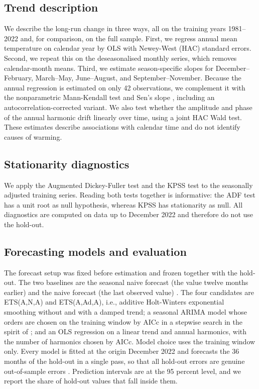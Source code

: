 \subsection{Trend description}

We describe the long-run change in three ways, all on the training years 1981--2022 and, for comparison, on the full sample. First, we regress annual mean temperature on calendar year by OLS with Newey-West (HAC) standard errors. Second, we repeat this on the deseasonalised monthly series, which removes calendar-month means. Third, we estimate season-specific slopes for December--February, March--May, June--August, and September--November. Because the annual regression is estimated on only 42 observations, we complement it with the nonparametric Mann-Kendall test \citep{mann1945nonparametric} and Sen's slope \citep{sen1968estimates}, including an autocorrelation-corrected variant. We also test whether the amplitude and phase of the annual harmonic drift linearly over time, using a joint HAC Wald test. These estimates describe associations with calendar time and do not identify causes of warming.

\subsection{Stationarity diagnostics}

We apply the Augmented Dickey-Fuller test \citep{dickey1979distribution} and the KPSS test \citep{kwiatkowski1992testing} to the seasonally adjusted training series. Reading both tests together is informative: the ADF test has a unit root as null hypothesis, whereas KPSS has stationarity as null. All diagnostics are computed on data up to December 2022 and therefore do not use the hold-out.

\subsection{Forecasting models and evaluation}

The forecast setup was fixed before estimation and frozen together with the hold-out. The two baselines are the seasonal naive forecast (the value twelve months earlier) and the naive forecast (the last observed value) \citep{hyndman2021forecasting}. The four candidates are ETS(A,N,A) and ETS(A,Ad,A), i.e., additive Holt-Winters exponential smoothing without and with a damped trend; a seasonal ARIMA model \citep{box2008time} whose orders are chosen on the training window by AICc in a stepwise search in the spirit of \citet{hyndman2008automatic}; and an OLS regression on a linear trend and annual harmonics, with the number of harmonics chosen by AICc. Model choice uses the training window only. Every model is fitted at the origin December 2022 and forecasts the 36 months of the hold-out in a single pass, so that all hold-out errors are genuine out-of-sample errors \citep{tashman2000out}. Prediction intervals are at the 95 percent level, and we report the share of hold-out values that fall inside them.

